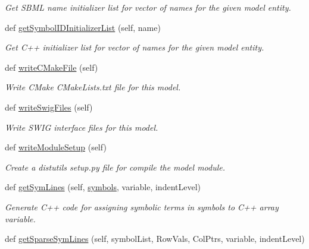 \begin{DoxyCompactItemize}
\begin{DoxyCompactList}\small\item\em Get S\+B\+ML name initializer list for vector of names for the given model entity. \end{DoxyCompactList}\item 
def \mbox{\hyperlink{classamici_1_1sbml__import_1_1_sbml_importer_ae0027a630db3a61e19be3dfeaa166304}{get\+Symbol\+I\+D\+Initializer\+List}} (self, name)
\begin{DoxyCompactList}\small\item\em Get C++ initializer list for vector of names for the given model entity. \end{DoxyCompactList}\item 
def \mbox{\hyperlink{classamici_1_1sbml__import_1_1_sbml_importer_ada11f0c35bdbd4d23c25f438df36f954}{write\+C\+Make\+File}} (self)
\begin{DoxyCompactList}\small\item\em Write C\+Make C\+Make\+Lists.\+txt file for this model. \end{DoxyCompactList}\item 
def \mbox{\hyperlink{classamici_1_1sbml__import_1_1_sbml_importer_a3d8fd08075f483671515fcfae70e1c29}{write\+Swig\+Files}} (self)
\begin{DoxyCompactList}\small\item\em Write S\+W\+IG interface files for this model. \end{DoxyCompactList}\item 
def \mbox{\hyperlink{classamici_1_1sbml__import_1_1_sbml_importer_a6398e5d904f66bf528047fdc48d50ae7}{write\+Module\+Setup}} (self)
\begin{DoxyCompactList}\small\item\em Create a distutils setup.\+py file for compile the model module. \end{DoxyCompactList}\item 
def \mbox{\hyperlink{classamici_1_1sbml__import_1_1_sbml_importer_a643f1be0c51c64c039480823a43bf800}{get\+Sym\+Lines}} (self, \mbox{\hyperlink{classamici_1_1sbml__import_1_1_sbml_importer_a591fb19f856c8faff2c302734ad80cc0}{symbols}}, variable, indent\+Level)
\begin{DoxyCompactList}\small\item\em Generate C++ code for assigning symbolic terms in symbols to C++ array {\ttfamily variable}. \end{DoxyCompactList}\item 
def \mbox{\hyperlink{classamici_1_1sbml__import_1_1_sbml_importer_a894c764b5114ad7b5c0ae2ec1e4e6b36}{get\+Sparse\+Sym\+Lines}} (self, symbol\+List, Row\+Vals, Col\+Ptrs, variable, indent\+Level)

\end{DoxyCompactItemize}
